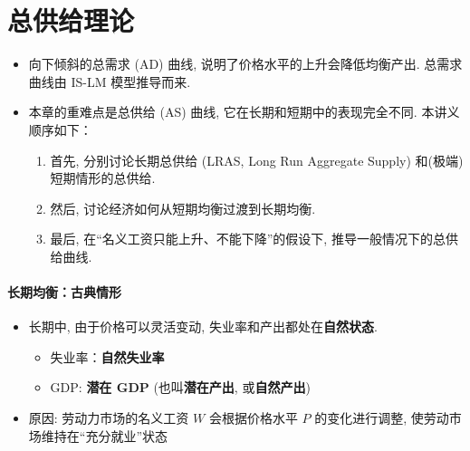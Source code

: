 \documentclass[10pt]{ctexart}
\author{}
\date{}
\begin{document}
\section{总供给理论}

\begin{itemize}
\item
  向下倾斜的总需求 (AD) 曲线, 说明了价格水平的上升会降低均衡产出. 总需求曲线由 IS-LM 模型推导而来. 
\item
  本章的重难点是总供给 (AS) 曲线, 它在长期和短期中的表现完全不同. 
  本讲义顺序如下：

  \begin{enumerate}
  \def\labelenumi{\arabic{enumi}.}
  \item
    首先, 分别讨论长期总供给 (LRAS, Long Run Aggregate Supply) 和(极端) 短期情形的总供给.
  \item
    然后, 讨论经济如何从短期均衡过渡到长期均衡.
  \item  
    最后, 在``名义工资只能上升、不能下降''的假设下, 推导一般情况下的总供给曲线.
  \end{enumerate}
\end{itemize}

\paragraph{长期均衡：古典情形}
\begin{itemize}
\item
  长期中, 由于价格可以灵活变动, 失业率和产出都处在\textbf{自然状态}.
  \begin{itemize}
  \item
    失业率：\textbf{自然失业率}
  \item
    GDP: \textbf{潜在 GDP} (也叫\textbf{潜在产出}, 或\textbf{自然产出})
  \end{itemize}
\item
  原因: 劳动力市场的名义工资 $W$ 会根据价格水平 $P$
  的变化进行调整, 使劳动市场维持在``充分就业''状态
\end{itemize}
\end{document}

